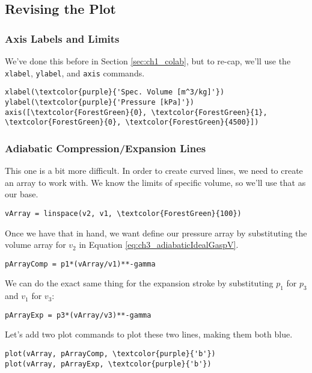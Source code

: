 \subsection{Revising the Plot}
\subsubsection{Axis Labels and Limits}
We've done this before in Section \ref{sec:ch1_colab}, but to re-cap, we'll use the \verb~xlabel~, \verb~ylabel~, and \verb~axis~ commands.
\begin{Verbatim}[commandchars=\\\{\}]
xlabel(\textcolor{purple}{'Spec. Volume [m^3/kg]'})
ylabel(\textcolor{purple}{'Pressure [kPa]'})
axis([\textcolor{ForestGreen}{0}, \textcolor{ForestGreen}{1}, \textcolor{ForestGreen}{0}, \textcolor{ForestGreen}{4500}])
\end{Verbatim}

\subsubsection{Adiabatic Compression/Expansion Lines} \label{sec:plottingCurvedLines}
This one is a bit more difficult.  In order to create curved lines, we need to create an array to work with.  We know the limits of specific volume, so we'll use that as our base.
\begin{Verbatim}[commandchars=\\\{\}]
vArray = linspace(v2, v1, \textcolor{ForestGreen}{100})
\end{Verbatim}

Once we have that in hand, we want define our pressure array by substituting the volume array for $v_2$ in Equation \ref{eq:ch3_adiabaticIdealGaspV}.

\begin{Verbatim}[commandchars=\\\{\}]
pArrayComp = p1*(vArray/v1)**-gamma
\end{Verbatim}

We can do the exact same thing for the expansion stroke by substituting $p_1$ for $p_3$ and $v_1$ for $v_3$:
\begin{Verbatim}[commandchars=\\\{\}]
pArrayExp = p3*(vArray/v3)**-gamma
\end{Verbatim}

Let's add two plot commands to plot these two lines, making them both blue.
\begin{Verbatim}[commandchars=\\\{\}]
plot(vArray, pArrayComp, \textcolor{purple}{'b'})
plot(vArray, pArrayExp, \textcolor{purple}{'b'})
\end{Verbatim}

